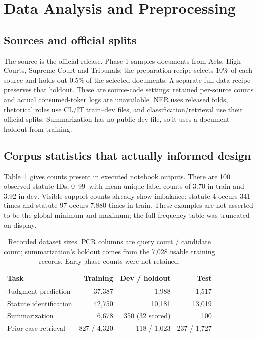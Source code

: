 \documentclass[11pt, oneside]{article}
\newcommand{\code}[1]{\texttt{\detokenize{#1}}}
\newcommand{\mainbreak}{\clearpage}
\begin{document}
\section{Data Analysis and Preprocessing}
\subsection{Sources and official splits}
The source is the official \code{Exploration-Lab/CS-781-Capstone} release. Phase 1 samples documents
from Acts, High Courts, Supreme Court and Tribunals; the preparation recipe selects 10\% of each source
and holds out 0.5\% of the selected documents. A separate full-data recipe preserves that holdout. These
are source-code settings: retained per-source counts and actual consumed-token logs are unavailable.
NER uses released folds, rhetorical roles use CL/IT train--dev files, and classification/retrieval use
their official splits. Summarization has no public dev file, so it uses a document holdout from training.

\mainbreak
\subsection{Corpus statistics that actually informed design}
Table~\ref{tab:data} gives counts present in executed notebook outputs. There are 100 observed statute
IDs, 0--99, with mean unique-label counts of 3.70 in train and 3.92 in dev. Visible support counts already
show imbalance: statute 4 occurs 341 times and statute 97 occurs 7,880 times in train. These examples are
not asserted to be the global minimum and maximum; the full frequency table was truncated on display.

\begin{table}[H]\centering\small
\caption{Recorded dataset sizes. PCR columns are query count / candidate count; summarization's holdout
comes from the 7,028 usable training records. Early-phase counts were not retained.}
\label{tab:data}
\begin{tabular}{lrrr}
\toprule Task & Training & Dev / holdout & Test\\\midrule
Judgment prediction & 37,387 & 1,988 & 1,517\\
Statute identification & 42,750 & 10,181 & 13,019\\
Summarization & 6,678 & 350 (32 scored) & 100\\
Prior-case retrieval & 827 / 4,320 & 118 / 1,023 & 237 / 1,727\\\bottomrule
\end{tabular}\end{table}
\end{document}
